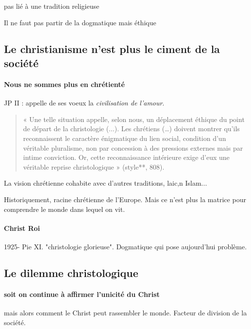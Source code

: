 \begin{Def}
  pas lié à une tradition religieuse  
\end{Def}

Il ne faut pas partir de la dogmatique mais éthique

\subsection{Le christianisme n’est plus le ciment de la société}

\paragraph{Nous ne sommes plus en chrétienté} JP II : appelle de ses voeux la \textit{civilisation de l'amour}.

\begin{quote}
    « Une telle situation appelle, selon nous, un déplacement éthique du point de départ de la christologie (...). Les chrétiens (…) doivent montrer qu’ils reconnaissent le caractère énigmatique du lien social, condition d’un véritable pluralisme, non par concession à des pressions externes mais par intime conviction. Or, cette reconnaissance intérieure exige d’eux une véritable reprise christologique » (style**, 808).
\end{quote}


La vision chrétienne cohabite avec d'autres traditions, laic,n Islam...
\begin{Ex}
Historiquement, racine chrétienne de l'Europe.  Mais ce n'est plus la matrice pour comprendre le monde dans lequel on vit.  
\end{Ex}

\paragraph{Christ Roi} 1925- Pie XI. "christologie glorieuse". Dogmatique qui pose aujourd'hui problème.
 \subsection{Le dilemme christologique}
 

\paragraph{soit on continue à affirmer l'unicité du Christ} mais alors comment le Christ peut rassembler le monde. Facteur de division de la société.


